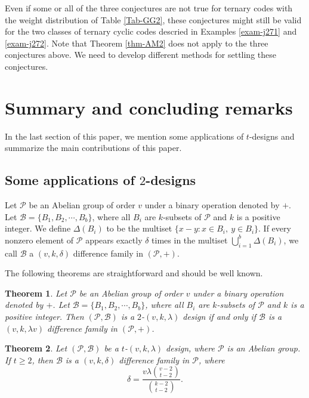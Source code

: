 \documentclass[1p,final]{elsarticle}
\newtheorem{theorem}{Theorem}
\newcommand{\cP}{{\mathcal{P}}}
\newcommand{\cB}{{\mathcal{B}}}
\begin{document}
Even if some or all of the three conjectures are not true for ternary codes with the weight 
distribution of Table \ref{Tab-GG2}, these conjectures might still be valid for the two 
classes of ternary cyclic codes descried in Examples \ref{exam-j271} and \ref{exam-j272}.  
Note that Theorem \ref{thm-AM2} does not apply to the three conjectures above. We need to 
develop different methods for settling these conjectures. 

\section{Summary and concluding remarks} 

In the last section of this paper, we mention some applications of $t$-designs and summarize the main contributions 
of this paper.  

\subsection{Some applications of $2$-designs} 

Let $\cP$ be an Abelian group of order $v$ under a binary operation denoted by $+$. Let 
$\cB=\{B_1, B_2, \cdots, B_b\}$, where all $B_i$ are $k$-subsets of $\cP$ and $k$ is a 
positive integer. We define $\Delta(B_i)$ to be the multiset $\{ x-y: x \in B_i,\  y \in B_i\}$.  
If every nonzero element of $\cP$ appears exactly $\delta$ times in the multiset 
$\bigcup_{i=1}^b \Delta(B_i)$, we call $\cB$ a $(v, k, \delta)$ difference family in 
$(\cP, +)$. 

The following theorems are straightforward and should be well known. 

\begin{theorem}\label{thm-june261}
Let $\cP$ be an Abelian group of order $v$ under a binary operation denoted by $+$. Let 
$\cB=\{B_1, B_2, \cdots, B_b\}$, where all $B_i$ are $k$-subsets of $\cP$ and $k$ is a 
positive integer. Then $(\cP, \cB)$ is a $2$-$(v, k, \lambda)$ design if and only if 
$\cB$ is a $(v, k, \lambda v)$ difference family in $(\cP, +)$.
\end{theorem}   

\begin{theorem}\label{thm-june262}
Let $(\cP, \cB)$ be a $t$-$(v, k, \lambda)$ design, where $\cP$ is an Abelian group. 
If $t \geq 2$, then $\cB$ is a $(v, k, \delta)$ difference family in $\cP$, 
where 
$$ 
\delta=\frac{v \lambda \binom{v-2}{t-2}}{\binom{k-2}{t-2}}. 
$$ 
\end{theorem}
\end{document}
